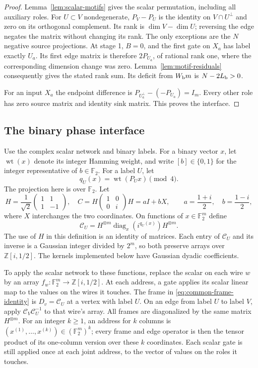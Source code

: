 \documentclass[11pt]{article}
\theoremstyle{definition}
\begin{document}
\begin{proof}
Lemma~\ref{lem:scalar-motifs} gives the scalar permutation, including
all auxiliary roles.  For $U\subset V$ nondegenerate,
$P_V-P_U$ is the identity on $V\cap U^\perp$ and zero on its
orthogonal complement.  Its rank is $\dim V-\dim U$; reversing the
edge negates the matrix without changing its rank.
The only exceptions are the $N$ negative source projections.
At stage 1, $B=0$, and the first gate on $X_a$ has label exactly $U_a$.
Its first edge matrix is therefore $2P_{U_a}$, of rational rank one,
where the corresponding dimension change was zero.
Lemma~\ref{lem:motif-residuals} consequently gives the stated rank sum.
Its deficit from $W_{\rm b}m$ is $N-2L_{\rm b}>0$.

For an input $X_a$ the endpoint difference is
$P_{U_a^\perp}-(-P_{U_a})=I_m$.  Every other role has zero source
matrix and identity sink matrix.  This proves the interface.
\end{proof}

\subsection{The binary phase interface}

Use the complex scalar network and binary labels.  For a binary vector
$x$, let $\operatorname{wt}(x)$ denote its integer Hamming weight, and
write $[b]\in\{0,1\}$ for the integer representative of $b\in\mathbb F_2$.
For a label $U$, let
\[
 q_U(x)=\operatorname{wt}(P_Ux)\pmod4.
\]
The projection here is over $\mathbb F_2$.
Let
\[
 H=\frac1{\sqrt2}\begin{pmatrix}1&1\\1&-1\end{pmatrix},\quad
 C=H\begin{pmatrix}1&0\\0&i\end{pmatrix}H
   =aI+bX,\qquad a=\frac{1+i}{2},\quad b=\frac{1-i}{2},
\]
where $X$ interchanges the two coordinates.  On functions of
$x\in\mathbb F_2^m$ define
\[
 \mathcal C_U=H^{\otimes m}\operatorname{diag}_x(i^{q_U(x)})H^{\otimes m}.
\]
The use of $H$ in this definition is an identity of matrices.  Each entry
of $\mathcal C_U$ and its inverse is a Gaussian integer divided by $2^m$,
so both preserve arrays over $\mathbb Z[i,1/2]$.  The kernels implemented
below have Gaussian dyadic coefficients.

To apply the scalar network to these functions, replace the scalar on
each wire $w$ by an array
$f_w:\mathbb F_2^m\to\mathbb Z[i,1/2]$.  At each address, a gate
applies its scalar linear map to the values on the wires it touches.
The frame in \eqref{eq:common-frame-identity} is $D_v=\mathcal C_U$ at a
vertex with label $U$.  On an edge from label $U$ to label $V$, apply
$\mathcal C_V\mathcal C_U^{-1}$ to that wire's array.
All frames are diagonalized by the same matrix $H^{\otimes m}$.
For an integer $k\ge1$, an address for $k$ columns is
$(x^{(1)},\ldots,x^{(k)})\in(\mathbb F_2^m)^k$; every frame and edge
operator is then the tensor product of its one-column version over
these $k$ coordinates.  Each scalar gate is still applied once at each
joint address, to the vector of values on the roles it touches.
\end{document}
